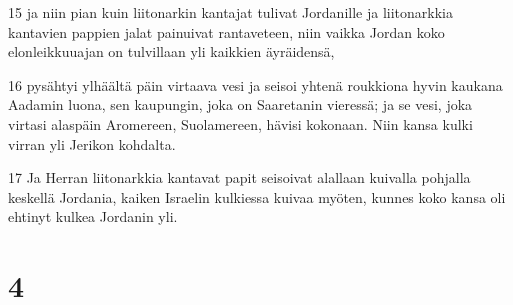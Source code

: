 \par 15 ja niin pian kuin liitonarkin kantajat tulivat Jordanille ja liitonarkkia kantavien pappien jalat painuivat rantaveteen, niin vaikka Jordan koko elonleikkuuajan on tulvillaan yli kaikkien äyräidensä,
\par 16 pysähtyi ylhäältä päin virtaava vesi ja seisoi yhtenä roukkiona hyvin kaukana Aadamin luona, sen kaupungin, joka on Saaretanin vieressä; ja se vesi, joka virtasi alaspäin Aromereen, Suolamereen, hävisi kokonaan. Niin kansa kulki virran yli Jerikon kohdalta.
\par 17 Ja Herran liitonarkkia kantavat papit seisoivat alallaan kuivalla pohjalla keskellä Jordania, kaiken Israelin kulkiessa kuivaa myöten, kunnes koko kansa oli ehtinyt kulkea Jordanin yli.

\chapter{4}


